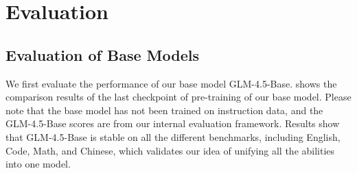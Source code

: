 \section{Evaluation}
\label{sec:evaluation}
\subsection{Evaluation of Base Models}
We first evaluate the performance of our base model GLM-4.5-Base.  shows the comparison results of the last checkpoint of pre-training of our base model. Please note that the base model has not been trained on instruction data, and the GLM-4.5-Base scores are from our internal evaluation framework.
Results show that GLM-4.5-Base is stable on all the different benchmarks, including English, Code, Math, and Chinese, which validates our idea of unifying all the abilities into one model.

